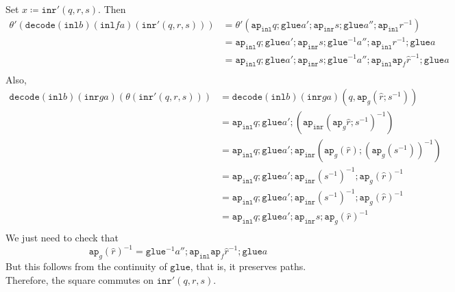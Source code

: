 \message{ !name(notes.tex)}\documentclass[12pt]{amsart}
\newcommand{\inv}{^{-1}}
\newcommand{\type}[1]{\mathtt{#1}}
\newcommand{\ap}{\type{ap}}
\newcommand{\inl}{\type{inl}}
\newcommand{\inr}{\type{inr}}
\newcommand{\glue}{\type{glue}}
\newcommand{\decode}{\type{decode}}
\theoremstyle{remark}
\theoremstyle{definition}
\begin{document}
Set
\(
  x \coloneqq \inr' ( q,r,s ).
\)
Then
\begin{align*}
  \theta' ( \decode ( \inl b ) ( \inl fa ) ( \inr' ( q,r,s ) ) )
  & = \theta' ( \ap_{\inl} q ; \glue a' ; \ap_{\inr} s ; \glue a'' ;
    \ap_{\inl} r^{-1} ) \\
  & =  \ap_{\inl} q ; \glue a' ; \ap_{\inr} s ; \glue^{-1} a'' ;
    \ap_{\inl} r^{-1} ; \glue a \\
   & =  \ap_{\inl} q ; \glue a' ; \ap_{\inr} s ; \glue^{-1} a'' ;
    \ap_{\inl} \ap_f \hat{r}^{-1} ; \glue a \\
\end{align*}
%
Also,
%
\begin{align*}
  \decode ( \inl b ) ( \inr ga ) ( \theta ( \inr' ( q,r,s ) ) )
  & = \decode ( \inl b )( \inr ga )( q , \ap_g ( \hat{r} ; s^{-1}
    ) ) \\
  & = \ap_{\inl} q ; \glue a' ; ( \ap_{\inr} ( \ap_g \hat{r} ; s^{-1} )^{-1} ) \\
  & = \ap_{\inl} q ; \glue a' ; \ap_{\inr} ( \ap_g ( \hat{r} ) ; ( \ap_g
    (s^{-1}) )^{-1} ) \\
  & = \ap_{\inl} q ; \glue a' ; \ap_{\inr} (s^{-1})^{-1} ;  \ap_g ( \hat{r} )^{-1} \\
  & = \ap_{\inl} q ; \glue a' ; \ap_{\inr} (s^{-1})^{-1} ;  \ap_g ( \hat{r} )^{-1} \\
  & = \ap_{\inl} q ; \glue a' ; \ap_{\inr} s ;  \ap_g ( \hat{r} )^{-1} \\
\end{align*}
%
We just need to check that
\[
  \ap_g ( \hat{r} )\inv =
  \glue\inv a'' ; \ap_{ \inl } \ap_f \hat{r}\inv ; \glue a
\]
But this follows from the continuity of \( \glue \), that is, it
preserves paths. Therefore, the square commutes on
\(
  \inr' ( q,r,s ).
\)
\end{document}
